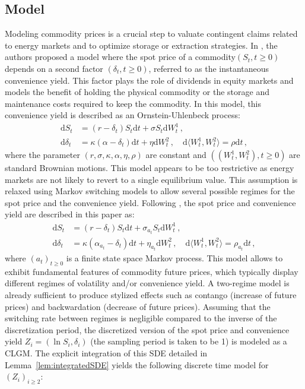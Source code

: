 \documentclass[nolayout]{article}
\theoremstyle{plain}
\theoremstyle{definition}
\newcommand{\1}{\mathbbm{1}}
\def\rmd{\mathrm{d}}
\def\eqsp{\,}
\begin{document}
\subsection{Model}
Modeling commodity prices is a crucial step to valuate contingent claims related to energy markets and to optimize storage or extraction strategies. In \cite{gibson:schwartz:1990,schwartz:1997}, the authors proposed a model where the spot price of a commodity$(S_t, t \geq 0)$ depends on a second factor $(\delta_t, t \geq 0)$, referred to as the instantaneous convenience yield. This factor plays the role of dividends in equity markets and models the benefit of holding the physical commodity or the storage and maintenance costs required to keep the commodity. In this model, this convenience yield is described as an Ornstein-Uhlenbeck process:
\begin{align*}
\rmd S_{t} & = (r-\delta_{t})S_{t}\rmd t+\sigma S_{t} \rmd W_{t}^{1} \eqsp,\\
\rmd \delta_{t} & = \kappa(\alpha-\delta_{t})\rmd t+\eta \rmd W_{t}^{2} \eqsp, \quad \rmd \langle W_t^1, W_t^2\rangle = \rho \rmd t\eqsp,
\end{align*}
where the parameter $\left(r, \sigma, \kappa, \alpha, \eta, \rho \right)$ are constant and $( (W_t^1,W_t^2), t \geq 0)$ are standard Brownian motions. This model appears to be too restrictive as energy markets are not likely to revert to a single equilibrium value. This assumption is relaxed using Markov switching models to allow several possible regimes for the spot price and the convenience yield. Following \cite{almansour:2016}, the spot price and convenience yield are described in this paper as:
\begin{align*}
\rmd S_{t} & = (r-\delta_{t})S_{t}\rmd t+\sigma_{a_t} S_{t}\rmd W_{t}^{1} \eqsp,\\
\rmd\delta_{t} & = \kappa (\alpha_{a_t} -\delta_{t})\rmd t+\eta_{a_t} \rmd W_{t}^{2} \eqsp, \quad \rmd\langle W_t^1, W_t^2\rangle = \rho_{a_t} \rmd t\eqsp,
\end{align*}
where $(a_t)_{t\ge 0}$ is a finite state space Markov process. This model allows to exhibit fundamental features of commodity future prices, which typically display different regimes of volatility and/or convenience yield. A two-regime model is already sufficient to produce stylized effects such as contango (increase of future prices) and backwardation (decrease of future prices).  Assuming that the switching rate between regimes is negligible compared to the inverse of the discretization period, the discretized version of the spot price and convenience yield $Z_i= (\ln S_i, \delta_i)$ (the sampling period is taken to be 1) is modeled as a CLGM. The explicit integration of this SDE detailed in Lemma~\ref{lem:integratedSDE} yields the following discrete time model for $(Z_i)_{i\ge 2}$:
\end{document}
